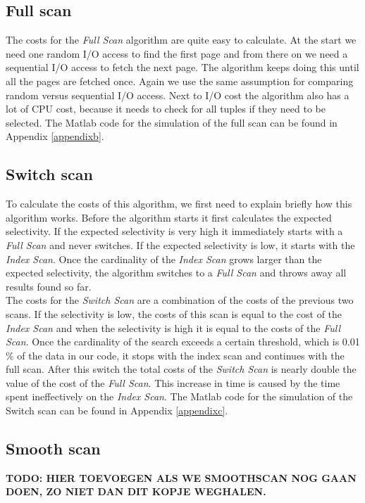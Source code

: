 \documentclass[a4paper,11pt,twoside]{article}
\begin{document}
\subsection{Full scan}
The costs for the \textit{Full Scan} algorithm are quite easy to calculate. At the start we need one random I/O access to find the first page and from there on we need a sequential I/O access to fetch the next page. The algorithm keeps doing this until all the pages are fetched once. Again we use the same assumption for comparing random versus sequential I/O access. Next to I/O cost the algorithm also has a lot of CPU cost, because it needs to check for all tuples if they need to be selected. The Matlab code for the simulation of the full scan can be found in Appendix \ref{appendixb}.

\subsection{Switch scan}
To calculate the costs of this algorithm, we first need to explain briefly how this algorithm works. Before the algorithm starts it first calculates the expected selectivity. If the expected selectivity is very high it immediately starts with a \textit{Full Scan} and never switches. If the expected selectivity is low, it starts with the \textit{Index Scan}. Once the cardinality of the \textit{Index Scan} grows larger than the expected selectivity, the algorithm switches to a \textit{Full Scan} and throws away all results found so far.\\
The costs for the \textit{Switch Scan} are a combination of the costs of the previous two scans. If the selectivity is low, the costs of this scan is equal to the cost of the \textit{Index Scan} and when the selectivity is high it is equal to the costs of the \textit{Full Scan}.  Once the cardinality of the search exceeds a certain threshold, which is 0.01$\%$ of the data in our code, it stops with the index scan and continues  with the full scan. After this switch the total costs of the \textit{Switch Scan} is nearly double the value of the cost of the \textit{Full Scan}. This increase in time is caused by the time spent ineffectively on the \textit{Index Scan}. The Matlab code for the simulation of the Switch scan can be found in Appendix \ref{appendixc}.


\subsection{Smooth scan}
\textbf{TODO: HIER TOEVOEGEN ALS WE SMOOTHSCAN NOG GAAN DOEN, ZO NIET DAN DIT KOPJE WEGHALEN.}
\end{document}
